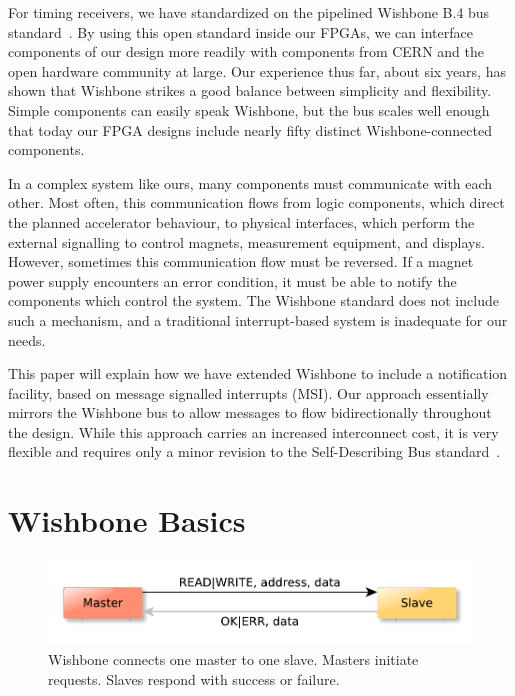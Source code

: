 \documentclass[a4paper]{jacow}
\begin{document}
For timing receivers, we have standardized on the pipelined Wishbone B.4 bus
standard~\cite{wb}.
By using this open standard inside our FPGAs, we can interface components of our design
more readily with components from CERN and the open hardware community at large.
Our experience thus far, about six years, has shown that
Wishbone strikes a good balance between simplicity and flexibility.
Simple components can easily speak Wishbone, 
but the bus scales well enough that today our FPGA designs include nearly fifty
distinct Wishbone-connected components.

In a complex system like ours, many components must communicate with each other.
Most often, this communication flows from logic components, which direct the
planned accelerator behaviour, to physical interfaces, which perform the
external signalling to control magnets, measurement equipment, and displays.
However, sometimes this communication flow must be reversed.
If a magnet power supply encounters an error condition, 
it must be able to notify the components which control the system.
The Wishbone standard does not include such a mechanism,
and a traditional interrupt-based system is inadequate for our needs.

This paper will explain how we have extended Wishbone to include a
notification facility, based on message signalled interrupts (MSI).
Our approach essentially mirrors the Wishbone bus to allow messages to flow
bidirectionally throughout the design.
While this approach carries an increased interconnect cost, 
it is very flexible and requires only a minor revision to the
Self-Describing Bus standard~\cite{sdb}.

\section{Wishbone Basics}

\begin{figure}[t]
  \centering
  \includegraphics*[width=\columnwidth]{THHA2O03f1}
  \caption{Wishbone connects one master to one slave. 
  Masters initiate requests. Slaves respond with
  success or failure.}
  \label{fig:wb-ptp}
\end{figure}
\end{document}
